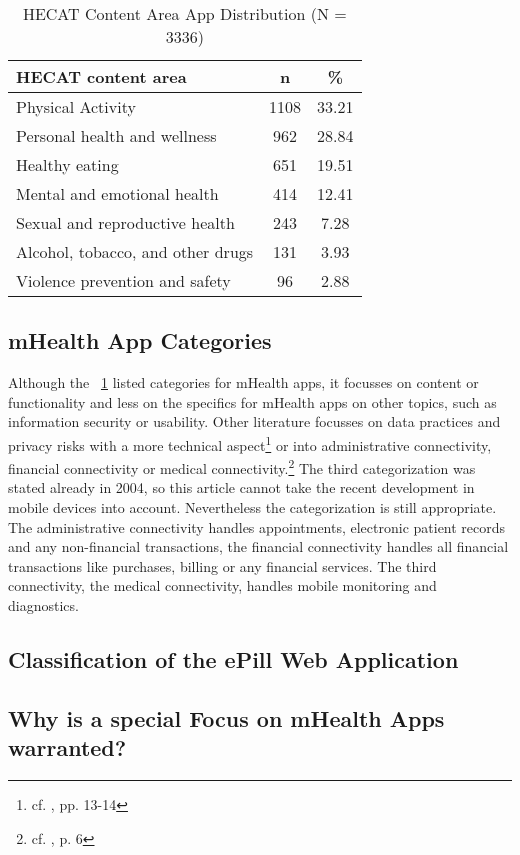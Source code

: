 \begin{table}[!htb]
    \center
    \begin{tabular}{l | c | c}
        \textbf{HECAT content area} & \textbf{n} & \textbf{\%}\footnotemark \\
        \hline
        Physical Activity & 1108 & 33.21 \\
        \hline
        Personal health and wellness & 962 & 28.84 \\
        \hline
        Healthy eating & 651 & 19.51 \\
        \hline
        Mental and emotional health & 414 & 12.41 \\
        \hline
        Sexual and reproductive health & 243 & 7.28 \\
        \hline
        Alcohol, tobacco, and other drugs & 131 & 3.93 \\
        \hline
        Violence prevention and safety & 96 & 2.88 \\
    \end{tabular}
    \caption[HECAT Content Area App Distribution]{HECAT Content Area App Distribution (N = 3336)\footnotemark}
    \label{tab:HECAT}
\end{table}
\addtocounter{footnote}{-1}
\addtocounter{footnote}{1}

\subsection{mHealth App Categories}
Although the ~\ref{tab:HECAT} listed categories for mHealth apps, it focusses on content or functionality and less on the specifics for mHealth apps on other topics, such as information security or usability. Other literature focusses on data practices and privacy risks with a more technical aspect\footnote{cf. \cite{Njie.2013}, pp. 13-14} 
or into administrative connectivity, financial connectivity or medical connectivity.\footnote{cf. \cite{Istepanian.2004}, p. 6} The third categorization was stated already in 2004, so this article cannot take the recent development in mobile devices into account. Nevertheless the categorization is still appropriate. The administrative connectivity handles appointments, electronic patient records and any non-financial transactions, the financial connectivity handles all financial transactions like purchases, billing or any financial services. The third connectivity, the medical connectivity, handles mobile monitoring and diagnostics.

\subsection{Classification of the ePill Web Application}

\subsection{Why is a special Focus on mHealth Apps warranted?}